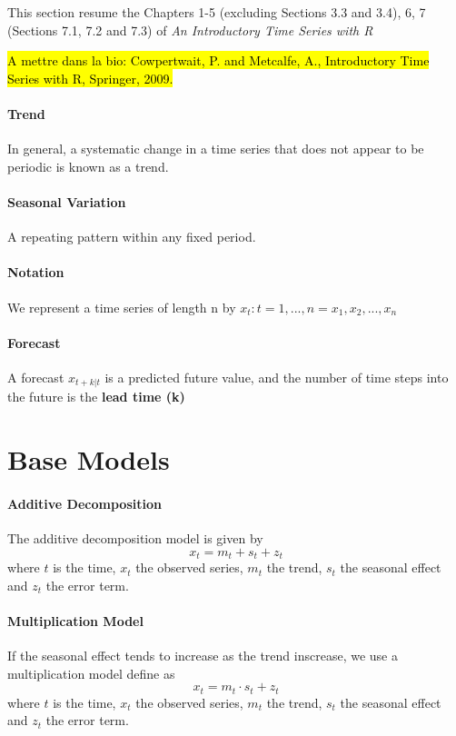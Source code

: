 { \color{red} This section resume the Chapters 1-5 (excluding Sections 3.3 and 3.4), 6, 7 (Sections 7.1, 7.2 and 7.3) of \emph{An Introductory Time Series with R} }

\hl{A mettre dans la bio: Cowpertwait, P. and Metcalfe, A., Introductory Time Series with R, Springer, 2009.}

\paragraph{Trend}
In general, a systematic change in a time series that does not appear to be periodic is known as a trend.

\paragraph{Seasonal Variation}
A repeating pattern within any fixed period.

\paragraph{Notation}
We represent a time series of length n by ${x_t : t = 1,...,n} = {x_1, x_2, ..., x_n}$

\paragraph{Forecast}
A forecast $\hat{x}_{t+k|t}$ is a predicted future value, and the number of time steps into the future is the \textbf{lead time (k)}

\section{Base Models}

\paragraph{Additive Decomposition}
The additive decomposition model is given by
\[ x_t = m_t + s_t + z_t \]
where $t$ is the time, $x_t$ the observed series, $m_t$ the trend, $s_t$ the seasonal effect and $z_t$ the error term.

\paragraph{Multiplication Model}
If the seasonal effect tends to increase as the trend inscrease, we use a multiplication model define as
\[ x_t = m_t \cdot s_t + z_t \]
where $t$ is the time, $x_t$ the observed series, $m_t$ the trend, $s_t$ the seasonal effect and $z_t$ the error term.

